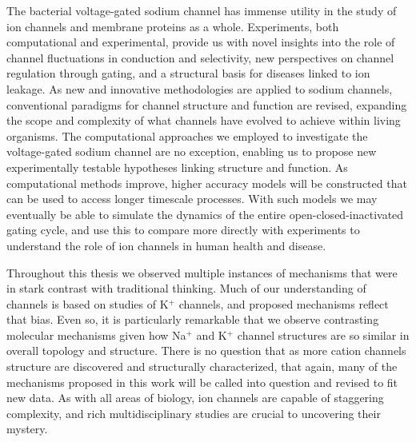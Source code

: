 \begin{refsection}
The bacterial voltage-gated sodium channel has immense utility in the study of ion channels and membrane proteins as a whole. Experiments, both computational and experimental, provide us with novel insights into the role of channel fluctuations in conduction and selectivity, new perspectives on channel regulation through gating, and a structural basis for diseases linked to ion leakage. As new and innovative methodologies are applied to sodium channels, conventional paradigms for channel structure and function are revised, expanding the scope and complexity of what channels have evolved to achieve within living organisms. The computational approaches we employed to investigate the voltage-gated sodium channel are no exception, enabling us to propose new experimentally testable hypotheses linking structure and function. As computational methods improve, higher accuracy models will be constructed that can be used to access longer timescale processes. With such models we may eventually be able to simulate the dynamics of the entire open-closed-inactivated gating cycle, and use this to compare more directly with experiments to understand the role of ion channels in human health and disease.

Throughout this thesis we observed multiple instances of mechanisms that were in stark contrast with traditional thinking. Much of our understanding of channels is based on studies of K$^+$ channels, and proposed mechanisms reflect that bias. Even so, it is particularly remarkable that we observe contrasting molecular mechanisms given how Na$^+$ and K$^+$ channel structures are so similar in overall topology and structure. There is no question that as more cation channels structure are discovered and structurally characterized, that again, many of the mechanisms proposed in this work will be called into question and revised to fit new data. As with all areas of biology, ion channels are capable of staggering complexity, and rich multidisciplinary studies are crucial to uncovering their mystery. 
 
 \printbibliography[heading=subbibnumbered,title={References}]
\end{refsection}
